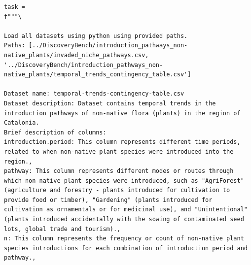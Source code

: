 \begin{verbatim}
task =
f"""\

Load all datasets using python using provided paths.
Paths: [../DiscoveryBench/introduction_pathways_non-native_plants/invaded_niche_pathways.csv, '../DiscoveryBench/introduction_pathways_non-native_plants/temporal_trends_contingency_table.csv']

Dataset name: temporal-trends-contingency-table.csv
Dataset description: Dataset contains temporal trends in the introduction pathways of non-native flora (plants) in the region of Catalonia.
Brief description of columns:
introduction.period: This column represents different time periods, related to when non-native plant species were introduced into the region.,
pathway: This column represents different modes or routes through which non-native plant species were introduced, such as "AgriForest" (agriculture and forestry - plants introduced for cultivation to provide food or timber), "Gardening" (plants introduced for cultivation as ornamentals or for medicinal use), and "Unintentional" (plants introduced accidentally with the sowing of contaminated seed lots, global trade and tourism).,
n: This column represents the frequency or count of non-native plant species introductions for each combination of introduction period and pathway.,


\end{verbatim}
